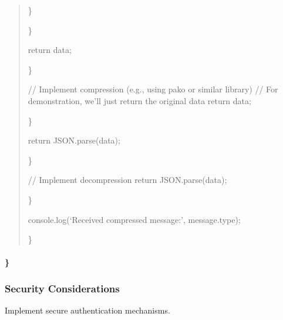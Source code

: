 \documentclass[letterpaper,10pt,english]{sphinxmanual}
\begin{document}
\begin{quote}
\begin{description}
\sphinxAtStartPar
\}

\end{description}

\sphinxAtStartPar
\}
\begin{description}
\begin{description}
\sphinxAtStartPar
return data;

\end{description}

\sphinxAtStartPar
\}

\sphinxAtStartPar
// Implement compression (e.g., using pako or similar library)
// For demonstration, we’ll just return the original data
return data;

\end{description}

\sphinxAtStartPar
\}
\begin{description}
\begin{description}
\sphinxAtStartPar
return JSON.parse(data);

\end{description}

\sphinxAtStartPar
\}

\sphinxAtStartPar
// Implement decompression
return JSON.parse(data);

\end{description}

\sphinxAtStartPar
\}
\begin{description}
\sphinxAtStartPar
console.log(‘Received compressed message:’, message.type);

\end{description}

\sphinxAtStartPar
\}
\end{quote}


\paragraph{\}}
\label{\detokenize{api/websocket-api:id140}}

\subsubsection{Security Considerations}
\label{\detokenize{api/websocket-api:security-considerations}}
\sphinxAtStartPar
Implement secure authentication mechanisms.
\end{document}
